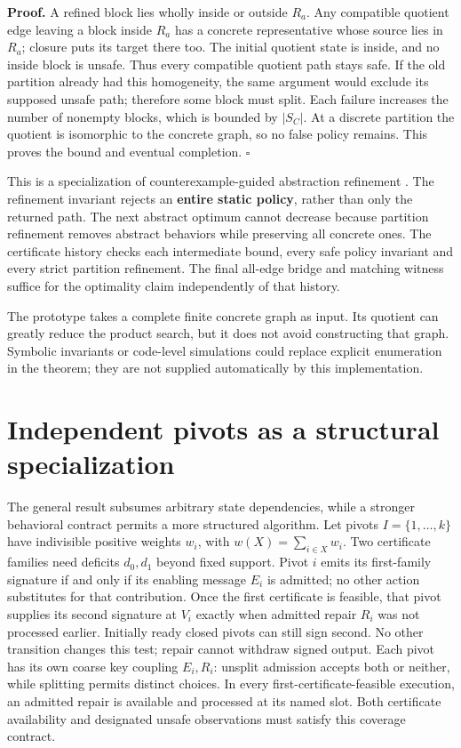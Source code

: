 \textbf{Proof.} A refined block lies wholly inside or outside \(R_a\).
Any compatible quotient edge leaving a block inside \(R_a\) has a
concrete representative whose source lies in \(R_a\); closure puts its
target there too. The initial quotient state is inside, and no inside
block is unsafe. Thus every compatible quotient path stays safe. If the
old partition already had this homogeneity, the same argument would
exclude its supposed unsafe path; therefore some block must split. Each
failure increases the number of nonempty blocks, which is bounded by
\(|S_C|\). At a discrete partition the quotient is isomorphic to the
concrete graph, so no false policy remains. This proves the bound and
eventual completion. \(\square\)

This is a specialization of counterexample-guided abstraction refinement
\cite{clarke2003cegar}. The refinement invariant rejects an
\textbf{entire static policy}, rather than only the returned path. The
next abstract optimum cannot decrease because partition refinement
removes abstract behaviors while preserving all concrete ones. The
certificate history checks each intermediate bound, every safe policy
invariant and every strict partition refinement. The final all-edge
bridge and matching witness suffice for the optimality claim
independently of that history.

The prototype takes a complete finite concrete graph as input. Its
quotient can greatly reduce the product search, but it does not avoid
constructing that graph. Symbolic invariants or code-level simulations
could replace explicit enumeration in the theorem; they are not supplied
automatically by this implementation.

\section{Independent pivots as a structural
specialization}\label{independent-pivots-as-a-structural-specialization}

The general result subsumes arbitrary state dependencies, while a
stronger behavioral contract permits a more structured algorithm. Let
pivots \(I=\{1,\ldots,k\}\) have indivisible positive weights \(w_i\),
with \(w(X)=\sum_{i\in X}w_i\). Two certificate families need deficits
\(d_0,d_1\) beyond fixed support. Pivot \(i\) emits its first-family
signature if and only if its enabling message \(E_i\) is admitted; no
other action substitutes for that contribution. Once the first
certificate is feasible, that pivot supplies its second signature at
\(V_i\) exactly when admitted repair \(R_i\) was not processed earlier.
Initially ready closed pivots can still sign second. No other transition
changes this test; repair cannot withdraw signed output. Each pivot has
its own coarse key coupling \(E_i,R_i\): unsplit admission accepts both
or neither, while splitting permits distinct choices. In every
first-certificate-feasible execution, an admitted repair is available
and processed at its named slot. Both certificate availability and
designated unsafe observations must satisfy this coverage contract.

